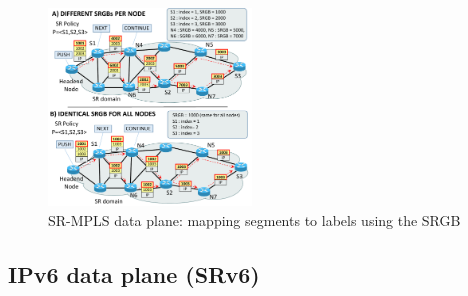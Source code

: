 \begin{figure}
    \centering
    \includegraphics[width=0.48\textwidth]{fig/srgb-mpls-ok.pdf}
    \caption{SR-MPLS data plane: mapping segments to labels using the SRGB}
    \label{fig:mpls-data plane}
    \vspace{-3ex}
\end{figure}


\subsection{IPv6 data plane (SRv6)}
\label{sec:ipv6 data plane}

